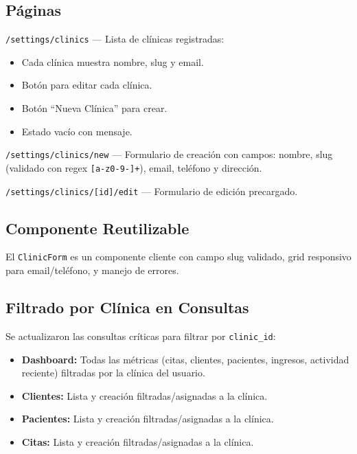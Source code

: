 \documentclass[12pt,a4paper]{article}
\begin{document}
\subsection{Páginas}

\texttt{/settings/clinics} — Lista de clínicas registradas:

\begin{itemize}[leftmargin=*]
    \item Cada clínica muestra nombre, slug y email.
    \item Botón para editar cada clínica.
    \item Botón ``Nueva Clínica'' para crear.
    \item Estado vacío con mensaje.
\end{itemize}

\texttt{/settings/clinics/new} — Formulario de creación con campos: nombre,
slug (validado con regex \texttt{[a-z0-9-]+}), email, teléfono y dirección.

\texttt{/settings/clinics/[id]/edit} — Formulario de edición precargado.

\subsection{Componente Reutilizable}

El \texttt{ClinicForm} es un componente cliente con campo slug validado,
grid responsivo para email/teléfono, y manejo de errores.

\subsection{Filtrado por Clínica en Consultas}

Se actualizaron las consultas críticas para filtrar por \texttt{clinic\_id}:

\begin{itemize}[leftmargin=*]
    \item \textbf{Dashboard:} Todas las métricas (citas, clientes, pacientes,
          ingresos, actividad reciente) filtradas por la clínica del usuario.
    \item \textbf{Clientes:} Lista y creación filtradas/asignadas a la clínica.
    \item \textbf{Pacientes:} Lista y creación filtradas/asignadas a la clínica.
    \item \textbf{Citas:} Lista y creación filtradas/asignadas a la clínica.
\end{itemize}
\end{document}
